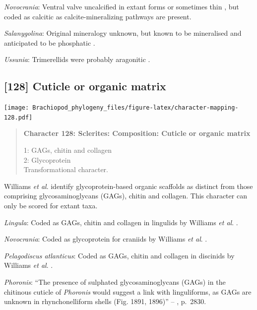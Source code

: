 \documentclass[openany]{book}
\begin{document}
\hypertarget{Novocrania-coding-127}{}
\emph{Novocrania}: Ventral valve uncalcified in extant forms or
sometimes thin \citep{Williams2000LinguliformeaCraniiformea}, but coded
as calcitic as calcite-mineralizing pathways are present.

\hypertarget{Salanygolina-coding-127}{}
\emph{Salanygolina}: Original mineralogy unknown, but known to be
mineralised and anticipated to be phosphatic
\citep{Holmer2009Theenigmatic}.

\hypertarget{Ussunia-coding-127}{}
\emph{Ussunia}: Trimerellids were probably aragonitic
\citep{Williams2000LinguliformeaCraniiformea}.

\subsection*{{[}128{]} Cuticle or organic
matrix}\label{cuticle-or-organic-matrix}

\texttt{[image: Brachiopod\_phylogeny\_files/figure-latex/character-mapping-128.pdf]}

\begin{quote}
\textbf{Character 128: Sclerites: Composition: Cuticle or organic
matrix}

1: GAGs, chitin and collagen\\
2: Glycoprotein\\
Transformational character.
\end{quote}

Williams \emph{et al}. \citeyearpar{Williams1996Asupra} identify
glycoprotein-based organic scaffolds as distinct from those comprising
glycosaminoglycans (GAGs), chitin and collagen. This character can only
be scored for extant taxa.

\hypertarget{Lingula-coding-128}{}
\emph{Lingula}: Coded as GAGs, chitin and collagen in lingulids by
Williams \emph{et al}. \citeyearpar{Williams1996Asupra}.

\hypertarget{Novocrania-coding-128}{}
\emph{Novocrania}: Coded as glycoprotein for craniids by Williams
\emph{et al}. \citeyearpar{Williams1996Asupra}.

\hypertarget{Pelagodiscus_atlanticus-coding-128}{}
\emph{Pelagodiscus atlanticus}: Coded as GAGs, chitin and collagen in
discinids by Williams \emph{et al}. \citeyearpar{Williams1996Asupra}.

\hypertarget{Phoronis-coding-128}{}
\emph{Phoronis}: ``The presence of sulphated glycosaminoglycans (GAGs)
in the chitinous cuticle of \emph{Phoronis}
\citep[p.~215]{Herrmann1997Phoronida} would suggest a link with
linguliforms, as GAGs are unknown in rhynchonelliform shells (Fig. 1891,
1896)'' -- \citet{Williams2007Supplement}, p.~2830.
\end{document}
